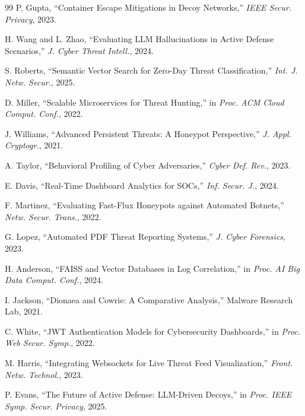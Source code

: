 \documentclass[12pt,a4paper]{report}
\begin{document}
\begin{thebibliography}{99}
P. Gupta, ``Container Escape Mitigations in Decoy Networks,'' \emph{IEEE Secur. Privacy}, 2023.

H. Wang and L. Zhao, ``Evaluating LLM Hallucinations in Active Defense Scenarios,'' \emph{J. Cyber Threat Intell.}, 2024.

S. Roberts, ``Semantic Vector Search for Zero-Day Threat Classification,'' \emph{Int. J. Netw. Secur.}, 2025.

D. Miller, ``Scalable Microservices for Threat Hunting,'' in \emph{Proc. ACM Cloud Comput. Conf.}, 2022.

J. Williams, ``Advanced Persistent Threats: A Honeypot Perspective,'' \emph{J. Appl. Cryptogr.}, 2021.

A. Taylor, ``Behavioral Profiling of Cyber Adversaries,'' \emph{Cyber Def. Rev.}, 2023.

E. Davis, ``Real-Time Dashboard Analytics for SOCs,'' \emph{Inf. Secur. J.}, 2024.

F. Martinez, ``Evaluating Fast-Flux Honeypots against Automated Botnets,'' \emph{Netw. Secur. Trans.}, 2022.

G. Lopez, ``Automated PDF Threat Reporting Systems,'' \emph{J. Cyber Forensics}, 2023.

H. Anderson, ``FAISS and Vector Databases in Log Correlation,'' in \emph{Proc. AI Big Data Comput. Conf.}, 2024.

I. Jackson, ``Dionaea and Cowrie: A Comparative Analysis,'' Malware Research Lab, 2021.

C. White, ``JWT Authentication Models for Cybersecurity Dashboards,'' in \emph{Proc. Web Secur. Symp.}, 2022.

M. Harris, ``Integrating Websockets for Live Threat Feed Visualization,'' \emph{Front. Netw. Technol.}, 2023.

P. Evans, ``The Future of Active Defense: LLM-Driven Decoys,'' in \emph{Proc. IEEE Symp. Secur. Privacy}, 2025.

\end{thebibliography}
\end{document}

